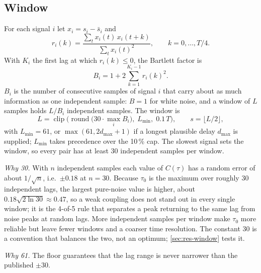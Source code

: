 \documentclass[11pt,a4paper]{article}
\begin{document}
\subsection{Window}
\label{sec:window}
For each signal $i$ let $x_i = s_i - \bar s_i$ and
\begin{equation}
r_i(k) = \frac{\sum_t x_i(t)\, x_i(t+k)}{\sum_t x_i(t)^2}, \qquad k = 0, \dots, T/4 .
\end{equation}
With $K_i$ the first lag at which $r_i(k) \le 0$, the Bartlett factor is
\begin{equation}
B_i = 1 + 2 \sum_{k=1}^{K_i - 1} r_i(k)^2 .
\label{eq:bartlett}
\end{equation}
$B_i$ is the number of consecutive samples of signal $i$ that carry about as much information as one independent sample: $B = 1$ for white noise, and a window of $L$ samples holds $L / B_i$ independent samples. The window is
\begin{equation}
L = \operatorname{clip}\!\Big(\operatorname{round}\big(30 \cdot \max_i B_i\big),\; L_{\min},\; 0.1\,T\Big), \qquad s = \lfloor L/2 \rfloor ,
\label{eq:window}
\end{equation}
with $L_{\min} = 61$, or $\max(61, 2 d_{\max} + 1)$ if a longest plausible delay $d_{\max}$ is supplied; $L_{\min}$ takes precedence over the 10\,\% cap. The slowest signal sets the window, so every pair has at least 30 independent samples per window.

\emph{Why 30.} With $n$ independent samples each value of $C(\tau)$ has a random error of about $1/\sqrt{n}$, i.e.\ $\pm0.18$ at $n = 30$. Because $\tau_0$ is the maximum over roughly 30 independent lags, the largest pure-noise value is higher, about $0.18\sqrt{2\ln 30} \approx 0.47$, so a weak coupling does not stand out in every single window; it is the 4-of-5 rule that separates a peak returning to the same lag from noise peaks at random lags. More independent samples per window make $\tau_0$ more reliable but leave fewer windows and a coarser time resolution. The constant 30 is a convention that balances the two, not an optimum; \cref{sec:res-window} tests it.

\emph{Why 61.} The floor guarantees that the lag range is never narrower than the published $\pm30$.
\end{document}
